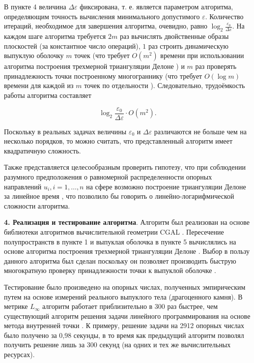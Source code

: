 \documentclass[a4paper, 10pt]{article}
\theoremstyle{definition}
\theoremstyle{plain}
\theoremstyle{plain}
\begin{document}
В пункте 4 величина $\Delta \varepsilon$ фиксирована, т. е. является
параметром алгоритма, определяющим точность вычисления минимального допустимого
$\varepsilon$. Количество итераций, необходимое для завершения алгоритма,
очевидно, равно $\log_{2} \frac{\varepsilon_{0}}{\Delta \varepsilon}$. На каждом
шаге алгоритма требуется $2m$ раз вычислять двойственные образы плоскостей (за
константное число операций), $1$ раз строить динамическую выпуклую оболочку
$m$ точек (что требует $O(m^2)$ времени при использовании алгоритма
построения трехмерной триангуляции Делоне \cite{Devillers}) и $m$ раз проверять
принадлежность точки построенному многограннику (что требует $O(\log m)$
времени для каждой из $m$ точек по отдельности \cite{Devillers}).
Следовательно, трудоёмкость работы алгоритма составляет

\begin{equation*}
 \log_{2} \frac{\varepsilon_{0}}{\Delta \varepsilon} \cdot O(m^2).
\end{equation*}

Поскольку в реальных задачах величины $\varepsilon_{0}$ и
$\Delta \varepsilon$ различаются не больше чем на несколько порядков, то
можно считать, что представленный алгоритм имеет квадратичную сложность.

Также представляется целесообразным проверить гипотезу, что при соблюдении
разумного предположения о равномерной распределенности опорных направлений
$u_i, i = 1, \ldots, n$ на сфере возможно построение триангуляции Делоне
за линейное время \cite{Attali}, что позволило бы говорить о
линейно-логарифмической сложности алгоритма.

\textbf{4. Реализация и тестирование алгоритма}.
Алгоритм был реализован на основе библиотеки алгоритмов вычислительной
геометрии CGAL \cite{cgal}. Пересечение полупространств в пункте 1 и выпуклая
оболочка в пункте 5 вычислялись на основе алгоритма построения трехмерной
триангуляции Делоне \cite{Devillers}. Выбор в пользу данного алгоритма был
сделан поскольку он позволяет производить быструю многократную проверку
принадлежности точки к выпуклой оболочке \cite{Devillers}.

Тестирование было произведено на опорных числах, полученных эмпирическим путем
на основе измерений реального выпуклого тела (драгоценного камня).
В метрике $L_{\infty}$ алгоритм работает приблизительно в 300
раз быстрее, чем существующий алгоритм решения задачи линейного программирования
на основе метода внутренней точки \cite{Ipopt}. К примеру, решение задачи на
2912 опорных числах было получено за 0,98 секунды, в то время как
предыдущий алгоритм позволял получить решение лишь за 300 секунд \cite{palachev}
(на одних и тех же вычислительных ресурсах).
\end{document}
